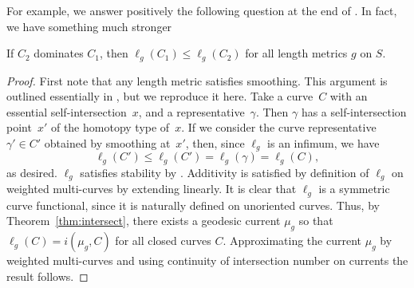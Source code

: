 For example, we answer positively the following question at the end of \cite{NC01:ShortestGeodesics}.
In fact, we have something much stronger

\begin{corollary}
If $C_2$ dominates $C_1$, then
    $\ell_g(C_1) \leq \ell_g(C_2)$ for all length metrics $g$ on $S$.
    \label{cor:domination}
\end{corollary}

\begin{proof}
First note that any length metric satisfies smoothing.
This argument is outlined essentially in \cite[Section~4.1]{MGT21:Smoothings}, but we reproduce it here.
 Take a
curve~$C$ with an
essential self-intersection~$x$, and a representative~$\gamma$. Then $\gamma$ has
a self-intersection point~$x'$ of the homotopy type of~$x$. If we
consider the
curve representative~$\gamma' \in C'$ obtained by smoothing at~$x'$, then,
since $\ell_g$ is an infimum, we have
\[
  \ell_g(C')\le \ell_g(C') = \ell_g(\gamma) = \ell_g(C),
\]
as desired. $\ell_g$ satisfies stability by \cite[Lemma~4.2]{MGT21:Smoothings}. Additivity is satisfied by definition of $\ell_g$ on weighted multi-curves by extending linearly.
It is clear that $\ell_g$ is a symmetric curve functional, since it is naturally defined on unoriented curves.
Thus, by Theorem~\ref{thm:intersect}, there exists a geodesic current $\mu_g$ so that $\ell_g(C)=i(\mu_g,C)$ for all closed curves $C$. Approximating the current $\mu_g$ by weighted multi-curves and using continuity of intersection number on currents the result follows.
\end{proof}


